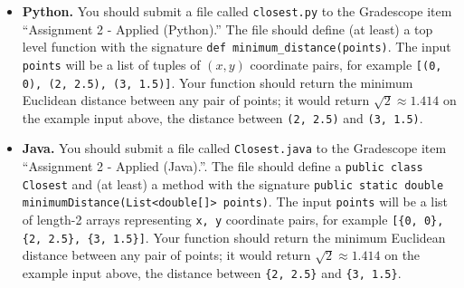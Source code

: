 \documentclass[11pt]{article}
\begin{document}
\begin{itemize}
	\item \textbf{Python.} You should submit a file called \texttt{closest.py} to the Gradescope item ``Assignment 2 - Applied (Python).'' The file should define (at least) a top level function with the signature \texttt{def minimum\_distance(points)}. The input \texttt{points} will be a list of tuples of $(x, y)$ coordinate pairs, for example \texttt{[(0, 0), (2, 2.5), (3, 1.5)]}. Your function should return the minimum Euclidean distance between any pair of points; it would return $\sqrt{2} \approx 1.414$ on the example input above, the distance between \texttt{(2, 2.5)} and \texttt{(3, 1.5)}.

	\item \textbf{Java.} You should submit a file called \texttt{Closest.java} to the Gradescope item ``Assignment 2 - Applied (Java).''. The file should define a \texttt{public class Closest} and (at least) a method with the signature \texttt{public static double minimumDistance(List<double[]> points)}. The input \texttt{points} will be a list of length-2 arrays representing \texttt{{x, y}} coordinate pairs, for example \texttt{[\{0, 0\}, \{2, 2.5\}, \{3, 1.5\}]}. Your function should return the minimum Euclidean distance between any pair of points; it would return $\sqrt{2} \approx 1.414$ on the example input above, the distance between \texttt{\{2, 2.5\}} and \texttt{\{3, 1.5\}}.

\end{itemize}
\end{document}
